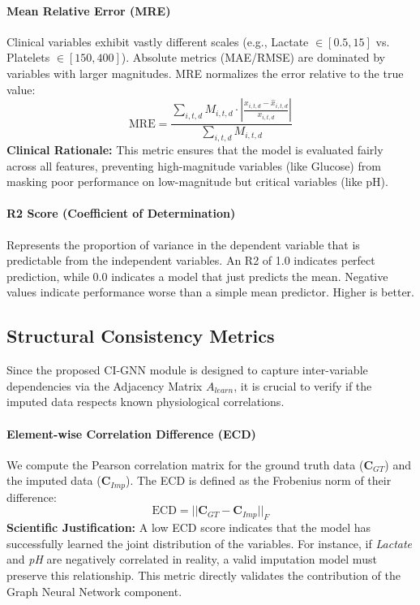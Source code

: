 \paragraph{Mean Relative Error (MRE)}
Clinical variables exhibit vastly different scales (e.g., Lactate $\in [0.5, 15]$ vs. Platelets $\in [150, 400]$). Absolute metrics (MAE/RMSE) are dominated by variables with larger magnitudes. MRE normalizes the error relative to the true value:
\begin{equation}
    \text{MRE} = \frac{\sum_{i,t,d} M_{i,t,d} \cdot \left| \frac{x_{i,t,d} - \hat{x}_{i,t,d}}{x_{i,t,d}} \right|}{\sum_{i,t,d} M_{i,t,d}}
\end{equation}
\textbf{Clinical Rationale:} This metric ensures that the model is evaluated fairly across all features, preventing high-magnitude variables (like Glucose) from masking poor performance on low-magnitude but critical variables (like pH).

\paragraph{R2 Score (Coefficient of Determination)} Represents the proportion of variance in the dependent variable that is predictable from the independent variables. An R2 of 1.0 indicates perfect prediction, while 0.0 indicates a model that just predicts the mean. Negative values indicate performance worse than a simple mean predictor. Higher is better.

\subsection{Structural Consistency Metrics}

Since the proposed CI-GNN module is designed to capture inter-variable dependencies via the Adjacency Matrix $A_{learn}$, it is crucial to verify if the imputed data respects known physiological correlations.

\paragraph{Element-wise Correlation Difference (ECD)}
We compute the Pearson correlation matrix for the ground truth data ($\mathbf{C}_{GT}$) and the imputed data ($\mathbf{C}_{Imp}$). The ECD is defined as the Frobenius norm of their difference:
\begin{equation}
    \text{ECD} = || \mathbf{C}_{GT} - \mathbf{C}_{Imp} ||_F
\end{equation}
\textbf{Scientific Justification:} A low ECD score indicates that the model has successfully learned the joint distribution of the variables. For instance, if \textit{Lactate} and \textit{pH} are negatively correlated in reality, a valid imputation model must preserve this relationship. This metric directly validates the contribution of the Graph Neural Network component.
